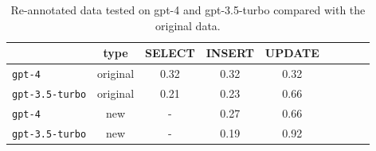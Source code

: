 \begin{table}[h]
\centering
\footnotesize
\renewcommand\tabcolsep{4pt}
\renewcommand\arraystretch{0.9}

\caption{Re-annotated data tested on gpt-4 and gpt-3.5-turbo compared with the original data.}
\vspace{-2mm}
\label{tab:db-re-annotated}
\begin{tabular}{@{}lcccccccc@{}}
\toprule
       & type  & SELECT & INSERT & UPDATE                                                    \\ \midrule
\texttt{gpt-4} & original   & 0.32 & 0.32 & 0.32                                                 \\
\texttt{gpt-3.5-turbo} & original   & 0.21 & 0.23 & 0.66                                             \\
\texttt{gpt-4} & new    & - & 0.27 & 0.66                                          \\
\texttt{gpt-3.5-turbo} & new  & - & 0.19 & 0.92



\\ \bottomrule
\end{tabular}

\end{table}